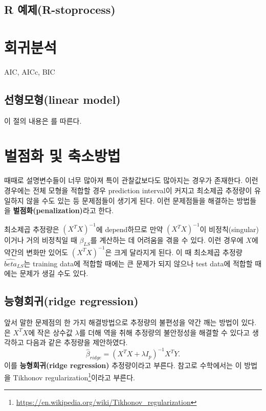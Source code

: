 \documentclass[b5paper,]{scrbook}
\theoremstyle{plain}
\theoremstyle{definition}
\numberwithin{equation}{section}
\renewcommand{\href}[2]{#2\footnote{\url{#1}}}
\begin{document}
\section{R 예제(R-stoprocess)}\label{r-r-stoprocess}

\chapter{회귀분석}\label{reg}

AIC, AICc, BIC

\section{선형모형(linear model)}\label{linear-model}

이 절의 내용은 \citep{Yee2015}를 따른다.

\chapter{벌점화 및 축소방법}\label{penalshrink}

때때로 설명변수들이 너무 많아져 특이 관찰값보다도 많아지는 경우가
존재한다. 이런 경우에는 전체 모형을 적합할 경우 prediction interval이
커지고 최소제곱 추정량이 유일하지 않을 수도 있는 등 문제점들이 생기게
된다. 이런 문제점들을 해결하는 방법들을
\textbf{벌점화(penalization)}라고 한다.

최소제곱 추정량은 \((X^{T}X)^{-1}\)에 depend하므로 만약
\((X^{T}X)^{-1}\)이 비정칙(singular)이거나 거의 비정칙일 때
\(\beta_{LS}\)를 계산하는 데 어려움을 겪을 수 있다. 이런 경우에 \(X\)에
약간의 변화만 있어도 \((X^{T}X)^{-1}\)은 크게 달라지게 된다. 이 때
최소제곱 추정량 \(\hat{beta}_{LS}\)는 training data에 적합할 때에는 큰
문제가 되지 않으나 test data에 적합할 때에는 문제가 생길 수도 있다.

\section{능형회귀(ridge regression)}\label{ridge-regression}

앞서 말한 문제점의 한 가지 해결방법으로 추정량의 불편성을 약간 깨는
방법이 있다. \citep{Hoerl1970}은 \(X^{T}X\)에 작은 상수값 \(\lambda\)를
더해 역을 취해 추정량의 불안정성을 해결할 수 있다고 생각하고 다음과 같은
추정량을 제안하였다.
\[\hat{\beta}_{ridge}=(X^{T}X+\lambda I_{p})^{-1}X^{T}Y.\] 이를
\textbf{능형회귀(ridge regression)} 추정량이라고 부른다. 참고로
수학에서는 이 방법을
\href{https://en.wikipedia.org/wiki/Tikhonov_regularization}{Tikhonov
regularization}이라고 부른다.
\end{document}
